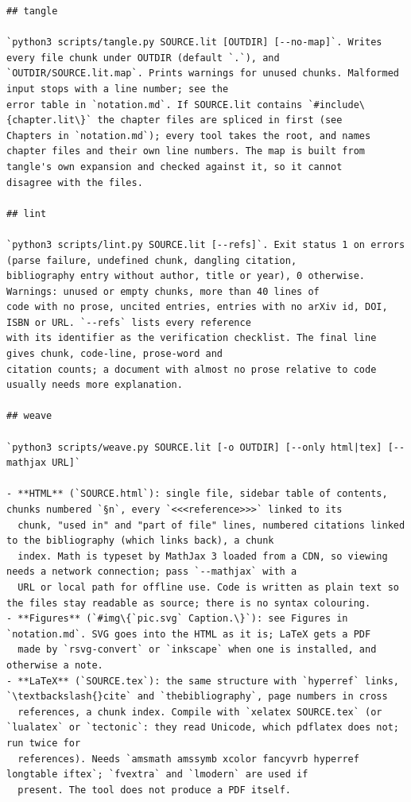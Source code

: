 \documentclass[10pt,a4paper]{article}
\newcounter{chunk}
\begin{document}
\begin{Verbatim}
## tangle

`python3 scripts/tangle.py SOURCE.lit [OUTDIR] [--no-map]`. Writes every file chunk under OUTDIR (default `.`), and
`OUTDIR/SOURCE.lit.map`. Prints warnings for unused chunks. Malformed input stops with a line number; see the
error table in `notation.md`. If SOURCE.lit contains `#include\{chapter.lit\}` the chapter files are spliced in first (see
Chapters in `notation.md`); every tool takes the root, and names chapter files and their own line numbers. The map is built from tangle's own expansion and checked against it, so it cannot
disagree with the files.

## lint

`python3 scripts/lint.py SOURCE.lit [--refs]`. Exit status 1 on errors (parse failure, undefined chunk, dangling citation,
bibliography entry without author, title or year), 0 otherwise. Warnings: unused or empty chunks, more than 40 lines of
code with no prose, uncited entries, entries with no arXiv id, DOI, ISBN or URL. `--refs` lists every reference
with its identifier as the verification checklist. The final line gives chunk, code-line, prose-word and
citation counts; a document with almost no prose relative to code usually needs more explanation.

## weave

`python3 scripts/weave.py SOURCE.lit [-o OUTDIR] [--only html|tex] [--mathjax URL]`

- **HTML** (`SOURCE.html`): single file, sidebar table of contents, chunks numbered `§n`, every `<<<reference>>>` linked to its
  chunk, "used in" and "part of file" lines, numbered citations linked to the bibliography (which links back), a chunk
  index. Math is typeset by MathJax 3 loaded from a CDN, so viewing needs a network connection; pass `--mathjax` with a
  URL or local path for offline use. Code is written as plain text so the files stay readable as source; there is no syntax colouring.
- **Figures** (`#img\{`pic.svg` Caption.\}`): see Figures in `notation.md`. SVG goes into the HTML as it is; LaTeX gets a PDF
  made by `rsvg-convert` or `inkscape` when one is installed, and otherwise a note.
- **LaTeX** (`SOURCE.tex`): the same structure with `hyperref` links, `\textbackslash{}cite` and `thebibliography`, page numbers in cross
  references, a chunk index. Compile with `xelatex SOURCE.tex` (or `lualatex` or `tectonic`: they read Unicode, which pdflatex does not; run twice for
  references). Needs `amsmath amssymb xcolor fancyvrb hyperref longtable iftex`; `fvextra` and `lmodern` are used if
  present. The tool does not produce a PDF itself.


\end{Verbatim}
\end{document}
